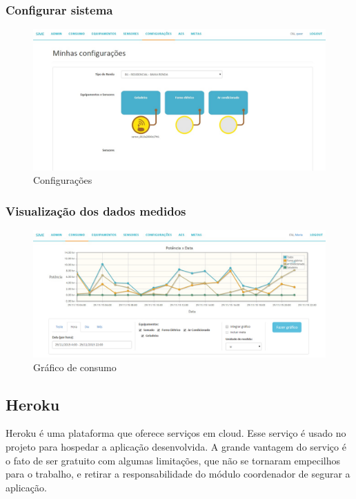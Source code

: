 \subsubsection{Configurar sistema}
\begin{figure}[H]
\centering
\includegraphics[width=1\textwidth]{figuras/configuracoes.jpg}
\caption{\label{fig:telas-config} Configurações}
\end{figure}


\subsubsection{Visualização dos dados medidos}
\begin{figure}[H]
\centering
\includegraphics[width=1\textwidth]{figuras/consumo.jpg}
\caption{\label{fig:telas-grafico} Gráfico de consumo}
\end{figure}


\subsection{Heroku}

Heroku é uma plataforma que oferece serviços em cloud. Esse serviço é usado no projeto para hospedar a aplicação desenvolvida. A grande vantagem do serviço  é o fato de ser gratuito com algumas limitações, que não se tornaram empecilhos para o trabalho, e retirar a responsabilidade do módulo coordenador de segurar a aplicação.
